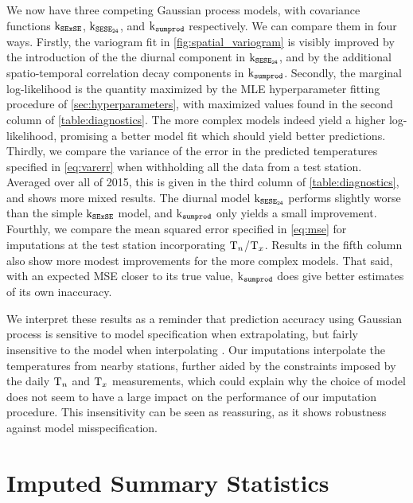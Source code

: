 \documentclass[12pt]{article}
\begin{document}
We now have three competing Gaussian process models, with covariance functions \(\operatorname{k_{\mathtt{SExSE}}}\), \(\operatorname{k_{\mathtt{SESE_{24}}}}\), and \(\operatorname{k_{\mathtt{sumprod}}}\) respectively. 
We can compare them in four ways.
Firstly, the variogram fit in \autoref{fig:spatial_variogram} is visibly improved by the introduction of the the diurnal component in \(\operatorname{k_{\mathtt{SESE_{24}}}}\), and by the additional spatio-temporal correlation decay components in \(\operatorname{k_{\mathtt{sumprod}}}\).
Secondly, the marginal log-likelihood is the quantity maximized by the MLE hyperparameter fitting procedure of \autoref{sec:hyperparameters}, with maximized values found in the second column of \autoref{table:diagnostics}.
The more complex models indeed yield a higher log-likelihood, promising a better model fit which should yield better predictions.
Thirdly, we compare the variance of the error in the predicted temperatures specified in \autoref{eq:varerr} when withholding all the data from a test station. 
Averaged over all of 2015, this is given in the third column of \autoref{table:diagnostics}, and shows more mixed results.
The diurnal model \(\operatorname{k_{\mathtt{SESE_{24}}}}\) performs slightly worse than the simple \(\operatorname{k_{\mathtt{SExSE}}}\) model, and \(\operatorname{k_{\mathtt{sumprod}}}\) only yields a small improvement.
Fourthly, we compare the mean squared error specified in \autoref{eq:mse} for imputations at the test station incorporating \(\mathrm{T}_{n}\)/\(\mathrm{T}_{x}\). 
Results in the fifth column also show more modest improvements for the more complex models.
That said, with an expected MSE closer to its true value, \(\operatorname{k_{\mathtt{sumprod}}}\) does give better estimates of its own inaccuracy.

We interpret these results as a reminder that prediction accuracy using Gaussian process is sensitive to model specification when extrapolating, but fairly insensitive to the model when interpolating \citep{stein2012interpolation}.
Our imputations interpolate the temperatures from nearby stations, further aided by the constraints imposed by the daily \(\mathrm{T}_{n}\) and \(\mathrm{T}_{x}\) measurements, which could explain why the choice of model does not seem to have a large impact on the performance of our imputation procedure.
This insensitivity can be seen as reassuring, as it shows robustness against model misspecification.

\section{Imputed Summary Statistics}
\end{document}
